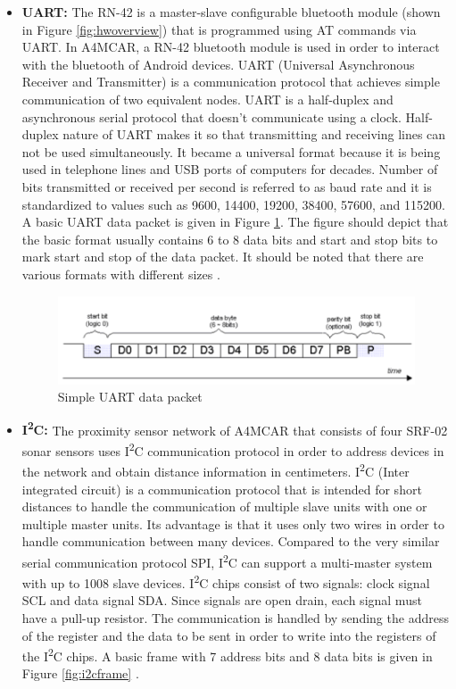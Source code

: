\begin{itemize}
	\item \textbf{UART:} The RN-42 is a master-slave configurable bluetooth module (shown in Figure \ref{fig:hwoverview}) that is programmed using AT commands via UART. In A4MCAR, a RN-42 bluetooth module is used in order to interact with the bluetooth of Android devices. UART (Universal Asynchronous Receiver and Transmitter) is a communication protocol that achieves simple communication of two equivalent nodes. UART is a half-duplex and asynchronous serial protocol that doesn't communicate using a clock. Half-duplex nature of UART makes it so that transmitting and receiving lines can not be used simultaneously. It became a universal format because it is being used in telephone lines and USB ports of computers for decades. Number of bits transmitted or received per second is referred to as baud rate and it is standardized to values such as 9600, 14400, 19200, 38400, 57600, and 115200. A basic UART data packet is given in Figure \ref{fig:uartpacket}. The figure should depict that the basic format usually contains 6 to 8 data bits and start and stop bits to mark start and stop of the data packet. It should be noted that there are various formats with different sizes \cite{uart}.
	\begin{figure}[!ht]
		\centering
		\captionsetup{justification=centering}
		\includegraphics[scale=0.5]{content/images/uartpacket.png}
		\caption{Simple UART data packet \cite{uart}}
		\label{fig:uartpacket}
	\end{figure}
	\item \textbf{I\textsuperscript{2}C:} The proximity sensor network of A4MCAR that consists of four SRF-02 sonar sensors uses I\textsuperscript{2}C communication protocol in order to address devices in the network and obtain distance information in centimeters. I\textsuperscript{2}C (Inter integrated circuit) is a communication protocol that is intended for short distances to handle the communication of multiple slave units with one or multiple master units. Its advantage is that it uses only two wires in order to handle communication between many devices. Compared to the very similar serial communication protocol SPI, I\textsuperscript{2}C can support a multi-master system with up to 1008 slave devices. I\textsuperscript{2}C chips consist of two signals: clock signal SCL and data signal SDA. Since signals are open drain, each signal must have a pull-up resistor. The communication is handled by sending the address of the register and the data to be sent in order to write into the registers of the I\textsuperscript{2}C chips. A basic frame with 7 address bits and 8 data bits is given in Figure \ref{fig:i2cframe} \cite{i2c}.

\end{itemize}

